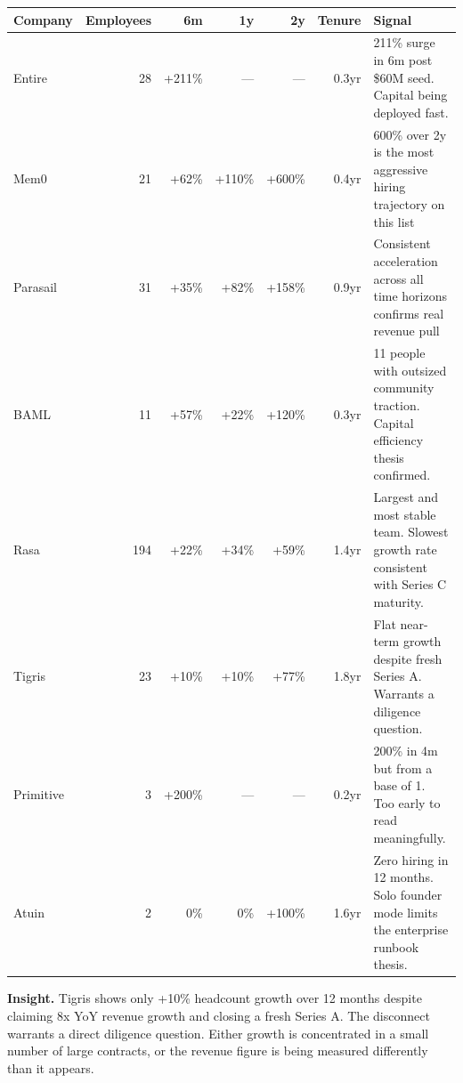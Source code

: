 \documentclass[11pt, letterpaper]{article}
\begin{document}
\begin{table}[H]
\centering
\begin{tabularx}{\linewidth}{@{} l r r r r r X @{}}
  \toprule
  \textbf{Company} &
  \textbf{Employees} &
  \textbf{6m} &
  \textbf{1y} &
  \textbf{2y} &
  \textbf{Tenure} &
  \textbf{Signal} \\
  \midrule
  Entire    & 28  & +211\% & ---   & ---    & 0.3yr &
    211\% surge in 6m post \$60M seed. Capital being deployed fast. \\[0.3em]
  Mem0      & 21  & +62\%  & +110\% & +600\% & 0.4yr &
    600\% over 2y is the most aggressive hiring trajectory on this list \\[0.3em]
  Parasail  & 31  & +35\%  & +82\%  & +158\% & 0.9yr &
    Consistent acceleration across all time horizons confirms real revenue pull \\[0.3em]
  BAML      & 11  & +57\%  & +22\%  & +120\% & 0.3yr &
    11 people with outsized community traction. Capital efficiency thesis confirmed. \\[0.3em]
  Rasa      & 194 & +22\%  & +34\%  & +59\%  & 1.4yr &
    Largest and most stable team. Slowest growth rate consistent with Series C maturity. \\[0.3em]
  Tigris    & 23  & +10\%  & +10\%  & +77\%  & 1.8yr &
    Flat near-term growth despite fresh Series A. Warrants a diligence question. \\[0.3em]
  Primitive & 3   & +200\% & ---    & ---    & 0.2yr &
    200\% in 4m but from a base of 1. Too early to read meaningfully. \\[0.3em]
  Atuin     & 2   & 0\%    & 0\%    & +100\% & 1.6yr &
    Zero hiring in 12 months. Solo founder mode limits the enterprise runbook thesis. \\
  \bottomrule
\end{tabularx}
\end{table}

\begin{callout}
  \textbf{Insight.} Tigris shows only +10\% headcount growth over 12 months
  despite claiming 8x YoY revenue growth and closing a fresh Series A. The
  disconnect warrants a direct diligence question. Either growth is concentrated
  in a small number of large contracts, or the revenue figure is being measured
  differently than it appears.
\end{callout}

\newpage
\end{document}
